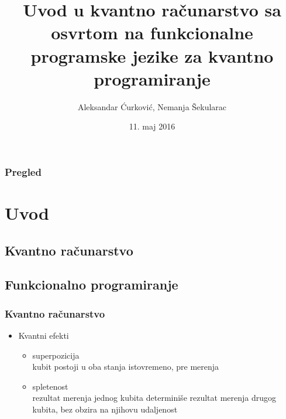 \documentclass{beamer}
\title[Short title]{Uvod u kvantno računarstvo sa osvrtom na funkcionalne programske jezike za kvantno programiranje} %
\author{Aleksandar Ćurković, Nemanja Šekularac} %
\institute %
{
Matematički fakultet \\ %
\medskip
\textit{nsekularac@gmail.com, curkovical@gmail.com} %
}
\date{11. maj 2016} %
\begin{document}
\begin{frame}
\titlepage %
\end{frame}

\begin{frame}
\frametitle{Pregled} %
\tableofcontents %
\end{frame}


\section{Uvod} %

\subsection{Kvantno računarstvo}%
\subsection{Funkcionalno programiranje}

\begin{frame}
\frametitle{Kvantno računarstvo}
\begin{itemize}
\item{Kvantni efekti}
	\begin{itemize}
    \item{superpozicija}\\
	kubit postoji u oba stanja istovremeno, pre merenja
    \item{spletenost}\\
	rezultat merenja jednog kubita determiniše rezultat merenja drugog kubita, bez obzira na njihovu udaljenost
    \end{itemize}
\end{itemize}

\end{frame}
\end{document}
